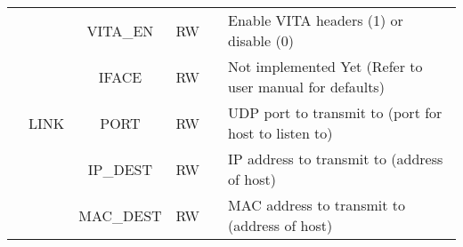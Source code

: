 \documentclass[11pt]{article}
\begin{document}
{\begin{landscape}
\begin{table}[H]
\begin{tabular}{|c|c|c|c|c|c|l|}
                       & \multirow{5}{*}{LINK}   & \multicolumn{2}{c|}{VITA\_EN}      & RW                &             & Enable VITA headers (1) or disable (0)                                \\ \cline{3-7} 
                       &                         & \multicolumn{2}{c|}{IFACE}         & RW                &             & Not implemented Yet (Refer to user manual for defaults)               \\ \cline{3-7} 
                       &                         & \multicolumn{2}{c|}{PORT}          & RW                &             & UDP port to transmit to (port for host to listen to)                  \\ \cline{3-7} 
                       &                         & \multicolumn{2}{c|}{IP\_DEST}      & RW                &             & IP address to transmit to (address of host)                           \\ \cline{3-7} 
                       &                         & \multicolumn{2}{c|}{MAC\_DEST}     & RW                &             & MAC address to transmit to (address of host)                          \\ \hline
\end{tabular}
\end{table}


\end{landscape}}
\end{document}
